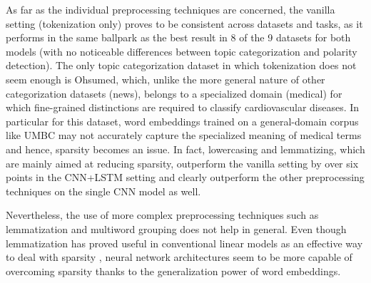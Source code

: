\documentclass[11pt,a4paper]{article}
\begin{document}
As far as the individual preprocessing techniques are concerned, the vanilla setting (tokenization only) proves to be consistent across datasets and tasks, as it performs in the same ballpark as the best result in 8 of the 9 datasets for both models (with no noticeable differences between topic categorization and polarity detection). The only topic categorization dataset in which tokenization does not seem enough is Ohsumed, which, unlike the more general nature of other categorization datasets (news), belongs to a specialized domain (medical) for which fine-grained distinctions are required to classify cardiovascular diseases. In particular for this dataset, word embeddings trained on a general-domain corpus like UMBC may not accurately capture the specialized meaning of medical terms and hence, sparsity becomes an issue.
In fact, lowercasing and lemmatizing, which are mainly aimed at reducing sparsity, outperform the vanilla setting by over six points in the CNN+LSTM setting and clearly outperform the other preprocessing techniques on the single CNN model as well. 

Nevertheless, the use of more complex preprocessing techniques such as lemmatization and multiword grouping does not help in general. Even though lemmatization has proved useful in conventional linear models as an effective way to deal with sparsity \cite{mullen2004sentiment,toman2006influence}, neural network architectures seem to be more capable of overcoming sparsity thanks to the generalization power of word embeddings. 
\end{document}
